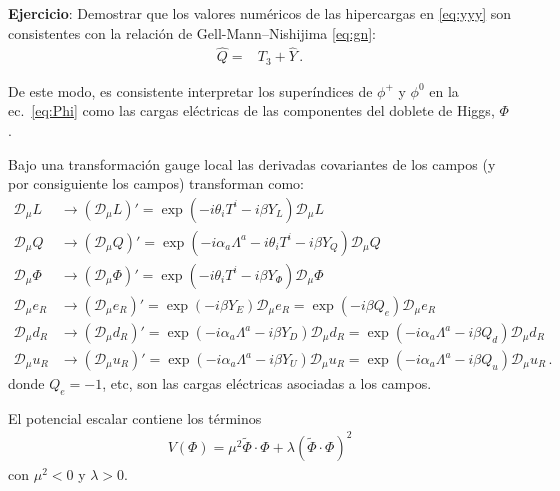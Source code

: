 \begin{frame}
\noindent
\textbf{Ejercicio}: Demostrar que los valores numéricos de las hipercargas en \eqref{eq:yyy} son consistentes con la relación de Gell-Mann--Nishijima \eqref{eq:gn}:
\begin{align}
 \widehat{Q}=&T_3+\widehat{Y}\,.
\end{align}

De este modo, es consistente interpretar los superíndices de $\phi^+$ y $\phi^0$ en la ec.~\eqref{eq:Phi} como las cargas eléctricas de las componentes del doblete de Higgs, $\Phi$.

Bajo una transformación gauge local las derivadas covariantes de los campos (y por consiguiente los campos) transforman como:
\begin{align}
  \mathcal{D}_\mu L&\to\left(\mathcal{D}_\mu L\right)'=\exp\left(-i\theta_iT^i-i\beta Y_L\right)\mathcal{D}_\mu L\nonumber\\
  \mathcal{D}_\mu Q&\to\left(\mathcal{D}_\mu Q\right)'=\exp\left(-i\alpha_a\Lambda^a-i\theta_iT^i-i\beta Y_Q\right)\mathcal{D}_\mu Q\nonumber\\
  \mathcal{D}_\mu \Phi&\to\left(\mathcal{D}_\mu \Phi\right)'=\exp\left(-i\theta_iT^i-i\beta Y_\Phi\right)\mathcal{D}_\mu \Phi\nonumber\\
  \mathcal{D}_\mu e_R&\to\left(\mathcal{D}_\mu e_R\right)'=\exp\left(-i\beta Y_{E}\right)\mathcal{D}_\mu e_R=\exp\left(-i\beta Q_{e}\right)\mathcal{D}_\mu e_R\nonumber\\
  \mathcal{D}_\mu d_R&\to\left(\mathcal{D}_\mu d_R\right)'=\exp\left(-i\alpha_a\Lambda^a-i\beta Y_{D}\right)\mathcal{D}_\mu d_R=\exp\left(-i\alpha_a\Lambda^a-i\beta Q_{d}\right)\mathcal{D}_\mu d_R\nonumber\\
  \mathcal{D}_\mu u_R&\to\left(\mathcal{D}_\mu u_R\right)'=\exp\left(-i\alpha_a\Lambda^a-i\beta Y_{U}\right)\mathcal{D}_\mu u_R=\exp\left(-i\alpha_a\Lambda^a-i\beta Q_{u}\right)\mathcal{D}_\mu u_R\,.
\end{align}
donde $Q_{e}=-1$, etc, son las cargas eléctricas asociadas a los campos.


El potencial escalar contiene los términos
\begin{align}
  V(\Phi)=\mu^2\widetilde{\Phi}\cdot\Phi+\lambda \left( \widetilde{\Phi}\cdot\Phi \right)^2 
\end{align}
con $\mu^2<0$ y $\lambda>0$. %

\end{frame}
